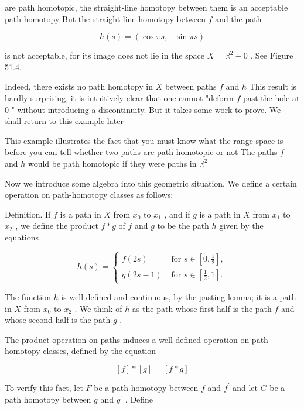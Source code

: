 are path homotopic, the straight-line homotopy between them is an acceptable path homotopy But the straight-line homotopy between \(f\) and the path

\[
h\left( s\right)  = \left( {\cos {\pi s}, - \sin {\pi s}}\right)
\]

is not acceptable, for its image does not lie in the space \(X = {\mathbb{R}}^{2} - 0\) . See Figure 51.4.

Indeed, there exists no path homotopy in \(X\) between paths \(f\) and \(h\) This result is hardly surprising, it is intuitively clear that one cannot "deform \(f\) past the hole at 0 " without introducing a discontinuity. But it takes some work to prove. We shall return to this example later

This example illustrates the fact that you must know what the range space is before you can tell whether two paths are path homotopic or not The paths \(f\) and \(h\) would be path homotopic if they were paths in \({\mathbb{R}}^{2}\)

Now we introduce some algebra into this geometric situation. We define a certain operation on path-homotopy classes as follows:

Definition. If \(f\) is a path in \(X\) from \({x}_{0}\) to \({x}_{1}\) , and if \(g\) is a path in \(X\) from \({x}_{1}\) to \({x}_{2}\) , we define the product \(f * g\) of \(f\) and \(g\) to be the path \(h\) given by the equations

\[
h\left( s\right)  = \left\{  \begin{array}{ll} f\left( {2s}\right) & \text{ for }s \in  \left\lbrack  {0,\frac{1}{2}}\right\rbrack  , \\  g\left( {{2s} - 1}\right) & \text{ for }s \in  \left\lbrack  {\frac{1}{2},1}\right\rbrack  . \end{array}\right.
\]

The function \(h\) is well-defined and continuous, by the pasting lemma; it is a path in \(X\) from \({x}_{0}\) to \({x}_{2}\) . We think of \(h\) as the path whose first half is the path \(f\) and whose second half is the path \(g\) .

The product operation on paths induces a well-defined operation on path-homotopy classes, defined by the equation

\[
\left\lbrack  f\right\rbrack   * \left\lbrack  g\right\rbrack   = \left\lbrack  {f * g}\right\rbrack
\]

To verify this fact, let \(F\) be a path homotopy between \(f\) and \({f}^{\prime }\) and let \(G\) be a path homotopy between \(g\) and \({g}^{\prime }\) . Define

